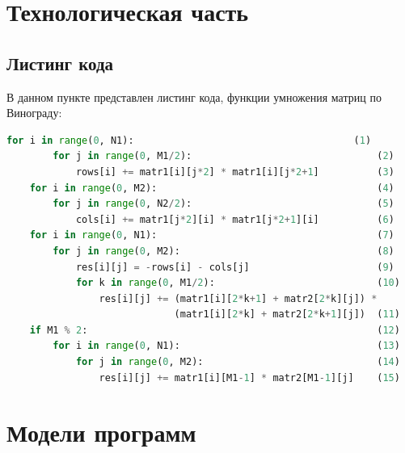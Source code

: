 \documentclass[a4paper, 12pt]{article}
\begin{document}
\section{Технологическая часть}
\begin{flushleft} 
	\subsection{Листинг кода}
	В данном пункте представлен листинг кода, функции умножения матриц по Винограду:


	\lstset{style=mystyle}

	\begin{lstlisting}[language=Python, caption = Умножение матриц по Винограду]
	for i in range(0, N1):                                      (1)
		for j in range(0, M1/2):								(2)	
			rows[i] += matr1[i][j*2] * matr1[i][j*2+1]			(3)
	for i in range(0, M2):										(4)	
		for j in range(0, N2/2):								(5)
			cols[i] += matr1[j*2][i] * matr1[j*2+1][i]			(6)
	for i in range(0, N1):										(7)
		for j in range(0, M2):									(8)
			res[i][j] = -rows[i] - cols[j]						(9)
			for k in range(0, M1/2):							(10)
				res[i][j] += (matr1[i][2*k+1] + matr2[2*k][j]) *
							 (matr1[i][2*k] + matr2[2*k+1][j])	(11)
	if M1 % 2:													(12)
		for i in range(0, N1):									(13)
			for j in range(0, M2):								(14)
				res[i][j] += matr1[i][M1-1] * matr2[M1-1][j]	(15)
	\end{lstlisting}
	
\end{flushleft}
\clearpage
\newpage
\section{Модели программ}
\end{document}
